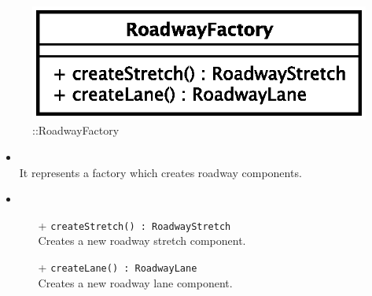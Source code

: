 \begin{figure}[h]
\centering
\includegraphics[scale=0.6,keepaspectratio]{images/solution/app/backend/roadway_factory.eps}
\caption{\pReactiveFactory::RoadwayFactory}
\label{fig:sd-app-roadway-factory}
\end{figure}
\FloatBarrier
\begin{itemize}
  \item \textbf{\descr} \\
It represents a factory which creates roadway components.
  \item \textbf{\ops} \\
  \begin{itemize} 
    \item[+] \texttt{createStretch() : RoadwayStretch} \\
Creates a new roadway stretch component.
    \item[+] \texttt{createLane() : RoadwayLane} \\
Creates a new roadway lane component.
  \end{itemize}
\end{itemize}
